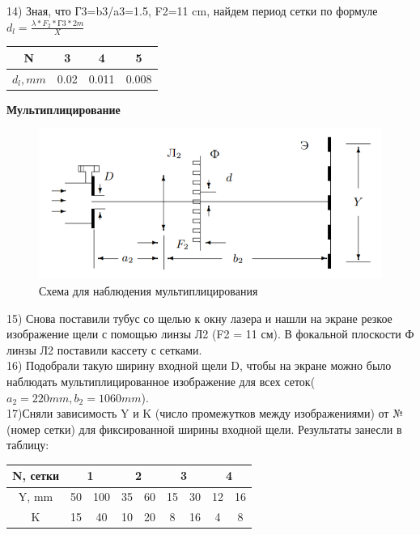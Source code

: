 \documentclass[a4paper,12pt]{article} %
\begin{document}
	14) Зная, что Г3=b3/a3=1.5, F2=11 cm, найдем период сетки по формуле  $d_l=\frac{\lambda *F_2* \text{Г3} *2m	}{X}$       \
	\begin{center}
	
	\begin{tabular}{|c|c|c|c|}
	\hline  
	N & 3 & 4 & 5 \\ 
	\hline 
	$d_l, mm$ & 0.02 & 0.011 & 0.008 \\ 
	\hline 
	\end{tabular} 
	
	\textbf{Мультиплицирование}
	
	\begin{figure}[H]
	\centering
	\includegraphics[width = 12 cm]{5.png}
	\caption{Схема для наблюдения мультиплицирования}
\end{figure}
\end{center}
15) Снова поставили тубус со щелью
к окну лазера 
и нашли на
экране резкое изображение щели с помощью линзы
Л2 (F2 = 11 см).
В фокальной плоскости
Ф линзы
Л2 поставили
кассету с сетками.\\
	16) Подобрали такую ширину входной щели
D, чтобы на экране можно было
наблюдать мультиплицированное изображение для всех сеток($a_2=220mm, b_2=1060mm$).\\
	17)Сняли зависимость
Y 
и
K (число промежутков между изображениями) от
№ (номер
сетки) для фиксированной ширины входной щели. Результаты занесли в таблицу: \\
\begin{center}

\begin{tabular}{|c|c|c|c|c|c|c|c|c|}
\hline 
N, сетки & \multicolumn{2}{c|}{1} & \multicolumn{2}{c|}{2} & \multicolumn{2}{c|}{3} &\multicolumn{2}{c|}{4} \\ 
\hline 
Y, mm & 50 & 100 & 35 & 60 & 15 & 30 & 12 & 16 \\ 
\hline 
K & 15 & 40 & 10 & 20 & 8 & 16 & 4 & 8 \\ 
\hline 
\end{tabular} 
	\end{center}
\end{document}
